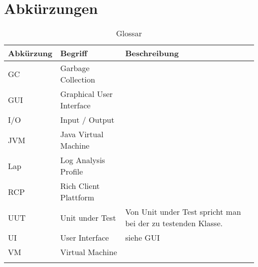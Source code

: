 \chapter*{Abkürzungen}\label{abkuerzungen}
  \begin{longtable}{|p{3cm}|p{5cm}|p{6cm}|}
\hline
  \textbf{Abkürzung} &\textbf{Begriff} &  \textbf{Beschreibung} \\\hline
  GC & Garbage Collection & \\\hline
GUI & Graphical User Interface & \\\hline
I/O & Input / Output & \\\hline
JVM & Java Virtual Machine & \\\hline
Lap & Log Analysis Profile & \\\hline
RCP & Rich Client Plattform &\\\hline
UUT & Unit under Test & Von Unit under Test spricht man bei der zu testenden Klasse.\\\hline
UI & User Interface & siehe GUI \\\hline
VM & Virtual Machine &  \\\hline
      \caption{Glossar}\\
  \end{longtable}



